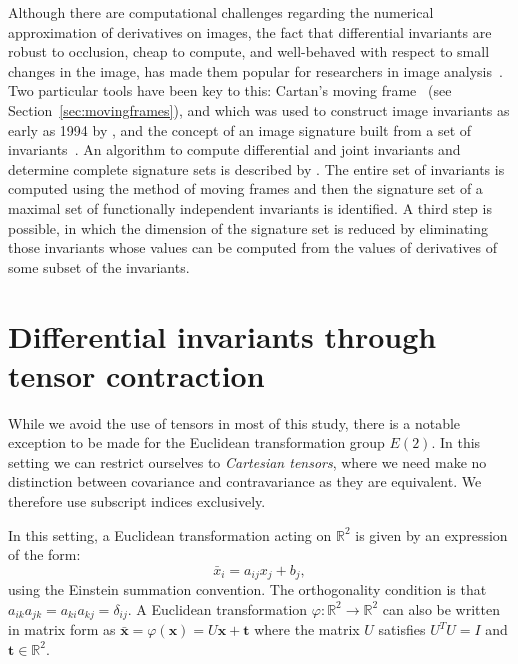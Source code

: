 \documentclass[review,onefignum,onetabnum]{siamonline190516}
\begin{document}
Although there are computational challenges regarding the numerical approximation of derivatives on images, the fact that differential invariants are robust to occlusion, cheap to compute, and well-behaved with respect to small changes in the image, has made them popular for researchers in image analysis~\citep{Florack1993}. Two particular tools have been key to this: Cartan's moving frame~\citep{Cartan35} (see Section~\ref{sec:movingframes}), and which was used to construct image invariants as early as 1994 by \citet{Faugeras1994}, and the concept of an image signature built from a set of invariants~\citep{Calabi1998}. An algorithm to compute differential and joint invariants and determine complete signature sets is described by \citet{Olver2005,Olver2007}. The entire set of invariants is computed using the method of moving frames and then the signature set of a maximal set of functionally independent invariants is identified. A third step is possible, in which the dimension of the signature set is reduced by eliminating those invariants whose values can be computed from the values of derivatives of some subset of the invariants. 


\section{Differential invariants through tensor contraction}
\label{sec:contraction}

While we avoid the use of tensors in most of this study, there is a notable
exception to be made for the Euclidean transformation group $E(2)$. In this
setting we can restrict ourselves to \emph{Cartesian tensors}, where we
need make no distinction between covariance and contravariance as they are
equivalent. We therefore use subscript indices exclusively.

In this setting, a Euclidean transformation acting on $\mathbb{R}^2$ is given
by an expression of the form:
\begin{equation*}
  \bar{x}_i = a_{ij}x_j + b_j,
\end{equation*}
using the Einstein summation convention. The orthogonality condition is
that $a_{ik}a_{jk} = a_{ki}a_{kj} = \delta_{ij}$. A Euclidean
transformation $\varphi \colon \mathbb{R}^2 \to \mathbb{R}^2$ can also be
written in matrix form as $\bar{\mathbf{x}} = \varphi(\mathbf{x}) =
U\mathbf{x} + \mathbf{t}$ where the matrix $U$ satisfies $U^TU = I$ and
$\mathbf{t} \in \mathbb{R}^2$.
\end{document}
